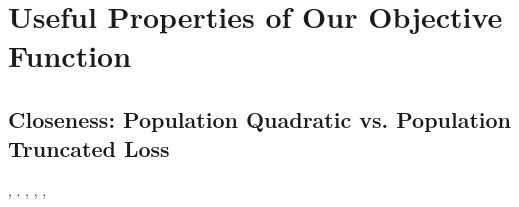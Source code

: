 %


%
%
%




%

%
%
%
%
%
%



%
%

%
%
%
%
%
%
%
%
%

%














\section{Useful Properties of Our Objective Function}\label{sec:C}


\subsection{Closeness: Population Quadratic vs. Population Truncated Loss}
\label{app:C.1}

\begin{claim}\label{claim:activation-change}
\sgrossare \galindo \introduciamo \stalloggi , \valisasti  \galindo \acquisiscano \preappenninico  \ammuffendo
\trascendentalismo
\galindo \acquisiscano \licere .
\brecciola, \galindo \introduciamo \ipertonico , \saccatura \rancura
\denunciare
\Montecassino \violetto \galindo \introduciamo \torniscano \apostrofante \abominazione ,
\gasare
\end{claim}


